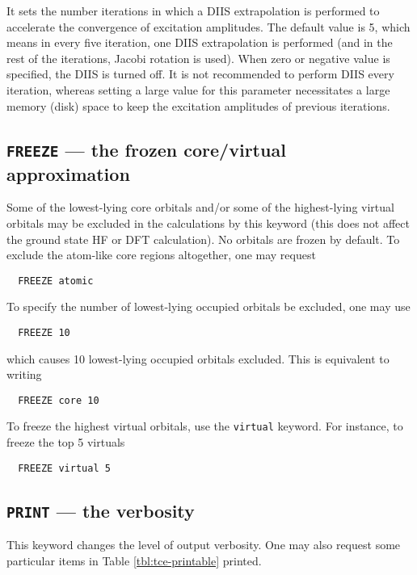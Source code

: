 It sets the number iterations in which a DIIS extrapolation is performed to accelerate
the convergence of excitation amplitudes.  The default value is 5, which means in every
five iteration, one DIIS extrapolation is performed (and in the rest of the iterations,
Jacobi rotation is used).  When zero or negative value is specified, the DIIS is turned
off.  It is not recommended to perform DIIS every iteration, whereas setting a large 
value for this parameter necessitates a large memory (disk) space to keep the excitation
amplitudes of previous iterations.

\subsection{{\tt FREEZE} --- the frozen core/virtual approximation}

Some of the lowest-lying core orbitals and/or some of the highest-lying
virtual orbitals may be excluded in the calculations
by this keyword (this does not affect the ground state HF or DFT calculation).
No orbitals are frozen by default.  To exclude the atom-like
core regions altogether, one may request
\begin{verbatim}
  FREEZE atomic
\end{verbatim}
To specify the number of lowest-lying occupied orbitals be excluded, one may use
\begin{verbatim}
  FREEZE 10
\end{verbatim}
which causes 10 lowest-lying occupied orbitals excluded.
This is equivalent to writing
\begin{verbatim}
  FREEZE core 10
\end{verbatim}
To freeze the highest virtual orbitals, use the \verb+virtual+
keyword.  For instance, to freeze the top 5 virtuals
\begin{verbatim}
  FREEZE virtual 5
\end{verbatim}

\subsection{{\tt PRINT} --- the verbosity}

This keyword changes the level of output verbosity.  One may also
request some particular items in Table \ref{tbl:tce-printable} printed.

